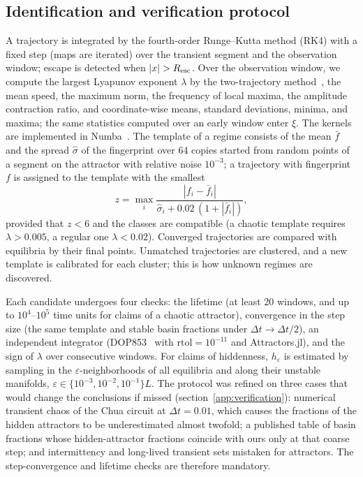 \subsection{Identification and verification protocol}\label{sec:protocol}

A trajectory is integrated by the fourth-order Runge--Kutta method (RK4) with a fixed step (maps are iterated) over the transient segment and the observation window; escape is detected when $|x|>R_{\rm esc}$. Over the observation window, we compute the largest Lyapunov exponent $\lambda$ by the two-trajectory method~\cite{Benettin1980}, the mean speed, the maximum norm, the frequency of local maxima, the amplitude contraction ratio, and coordinate-wise means, standard deviations, minima, and maxima; the same statistics computed over an early window enter $\xi$. The kernels are implemented in Numba~\cite{Lam2015Numba}. The template of a regime consists of the mean $\bar f$ and the spread $\hat\sigma$ of the fingerprint over 64 copies started from random points of a segment on the attractor with relative noise $10^{-3}$; a trajectory with fingerprint $f$ is assigned to the template with the smallest
\begin{equation}
z=\max_i\frac{|f_i-\bar f_i|}{\hat\sigma_i+0.02\,(1+|\bar f_i|)},
\label{eq:z}
\end{equation}
provided that $z<6$ and the classes are compatible (a chaotic template requires $\lambda>0.005$, a regular one $\lambda<0.02$). Converged trajectories are compared with equilibria by their final points. Unmatched trajectories are clustered, and a new template is calibrated for each cluster; this is how unknown regimes are discovered.

Each candidate undergoes four checks: the lifetime (at least 20 windows, and up to $10^4$--$10^5$ time units for claims of a chaotic attractor), convergence in the step size (the same template and stable basin fractions under $\Delta t\to\Delta t/2$), an independent integrator (DOP853~\cite{Hairer1993} with $\mathrm{rtol}=10^{-11}$ and Attractors.jl), and the sign of $\lambda$ over consecutive windows. For claims of hiddenness, $h_\varepsilon$ is estimated by sampling in the $\varepsilon$-neighborhoods of all equilibria and along their unstable manifolds, $\varepsilon\in\{10^{-3},10^{-2},10^{-1}\}L$. The protocol was refined on three cases that would change the conclusions if missed (section~\ref{app:verification}): numerical transient chaos of the Chua circuit at $\Delta t=0.01$, which causes the fractions of the hidden attractors to be underestimated almost twofold; a published table of basin fractions whose hidden-attractor fractions coincide with ours only at that coarse step; and intermittency and long-lived transient sets mistaken for attractors. The step-convergence and lifetime checks are therefore mandatory.
